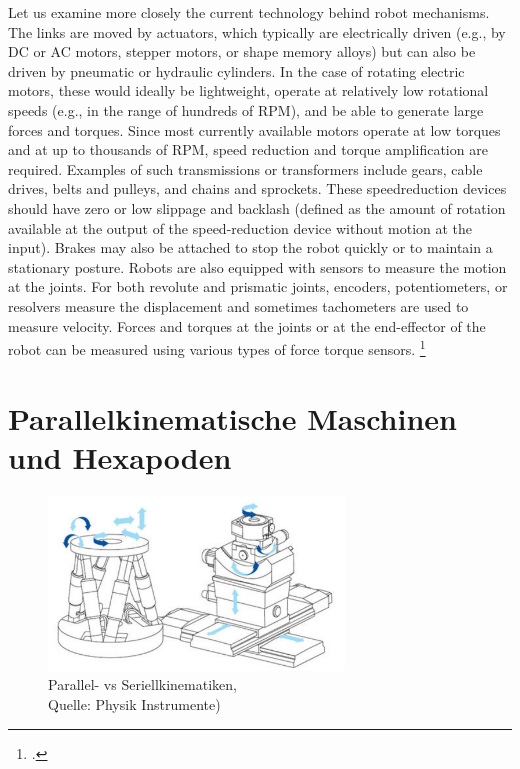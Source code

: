 \begin{em}
Let us examine more closely the current technology behind robot mechanisms. The links are moved by actuators, which typically are electrically driven
(e.g., by DC or AC motors, stepper motors, or shape memory alloys) but can
also be driven by pneumatic or hydraulic cylinders. In the case of rotating electric motors, these would ideally be lightweight, operate at relatively low rotational speeds (e.g., in the range of hundreds of RPM), and be able to generate
large forces and torques. Since most currently available motors operate at low
torques and at up to thousands of RPM, speed reduction and torque amplification are required. Examples of such transmissions or transformers include
gears, cable drives, belts and pulleys, and chains and sprockets. These speedreduction devices should have zero or low slippage and backlash (defined as
the amount of rotation available at the output of the speed-reduction device
without motion at the input). Brakes may also be attached to stop the robot
quickly or to maintain a stationary posture.
Robots are also equipped with sensors to measure the motion at the joints.
For both revolute and prismatic joints, encoders, potentiometers, or resolvers
measure the displacement and sometimes tachometers are used to measure velocity. Forces and torques at the joints or at the end-effector of the robot can be
measured using various types of force torque sensors. \footcite[Vgl.][1-2]{Lynch2017} 
\end{em}

\section{Parallelkinematische Maschinen und Hexapoden}

\begin{figure}[H]
    \centering
    \includegraphics[width=0.7\textwidth]{graphics/intro/intro_pkm_advantages.jpg}
    \caption[Folie]{Parallel- vs Seriellkinematiken, \\Quelle: Physik Instrumente)}
    \label{fig:intro_verbesserung_genauigkeit}
\end{figure}

